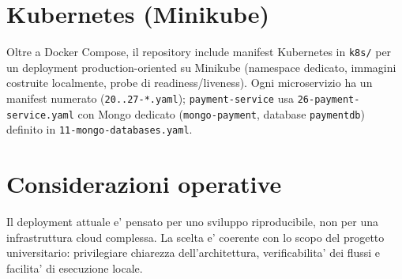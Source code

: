\section{Kubernetes (Minikube)}

Oltre a Docker Compose, il repository include manifest Kubernetes in \texttt{k8s/} per un deployment production-oriented su Minikube (namespace dedicato, immagini costruite localmente, probe di readiness/liveness). Ogni microservizio ha un manifest numerato (\texttt{20..27-*.yaml}); \texttt{payment-service} usa \texttt{26-payment-service.yaml} con Mongo dedicato (\texttt{mongo-payment}, database \texttt{paymentdb}) definito in \texttt{11-mongo-databases.yaml}.

\section{Considerazioni operative}

Il deployment attuale e' pensato per uno sviluppo riproducibile, non per una infrastruttura cloud complessa. La scelta e' coerente con lo scopo del progetto universitario: privilegiare chiarezza dell'architettura, verificabilita' dei flussi e facilita' di esecuzione locale.
